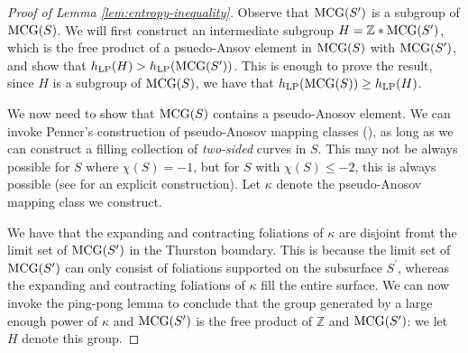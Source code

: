 \documentclass[12pt, reqno]{amsart}
\begin{document}
\begin{proof}[Proof of Lemma \ref{lem:entropy-inequality}]
  Observe that $\mathrm{MCG}(S^{\prime})$ is a subgroup of $\mathrm{MCG}(S)$.
  We will first construct an intermediate subgroup $H = \mathbb{Z} * \mathrm{MCG}(S^{\prime})$, which is the free product of a psuedo-Ansov element in $\mathrm{MCG}(S)$ with $\mathrm{MCG}(S^{\prime})$, and show that $h_{\mathrm{LP}}(H) > h_{\mathrm{LP}}(\mathrm{MCG}(S^{\prime}))$.
  This is enough to prove the result, since $H$ is a subgroup of $\mathrm{MCG}(S)$, we have that $h_{\mathrm{LP}}(\mathrm{MCG}(S)) \geq h_{\mathrm{LP}}(H)$.

  We now need to show that $\mathrm{MCG}(S)$ contains a pseudo-Anosov element.
  We can invoke Penner's construction of pseudo-Anosov mapping classes (\cite[Theorem 4.1]{penner1988construction}), as long as we can construct a filling collection of \emph{two-sided} curves in $S$.
  This may not be always possible for $S$ where $\chi(S) = -1$, but for $S$ with $\chi(S) \leq -2$, this is always possible (see \textcite{khan2023pseudo} for an explicit construction).
  Let $\kappa$ denote the pseudo-Anosov mapping class we construct.

  We have that the expanding and contracting foliations of $\kappa$ are disjoint fromt the limit set of $\mathrm{MCG}(S^{\prime})$ in the Thurston boundary.
  This is because the limit set of $\mathrm{MCG}(S^{\prime})$ can only consist of foliations supported on the subsurface $S^{\prime}$, whereas the expanding and contracting foliations of $\kappa$ fill the entire surface.
  We can now invoke the ping-pong lemma to conclude that the group generated by a large enough power of $\kappa$ and $\mathrm{MCG}(S^{\prime})$ is the free product of $\mathbb{Z}$ and $\mathrm{MCG}(S^{\prime})$: we let $H$ denote this group.


\end{proof}
\end{document}

